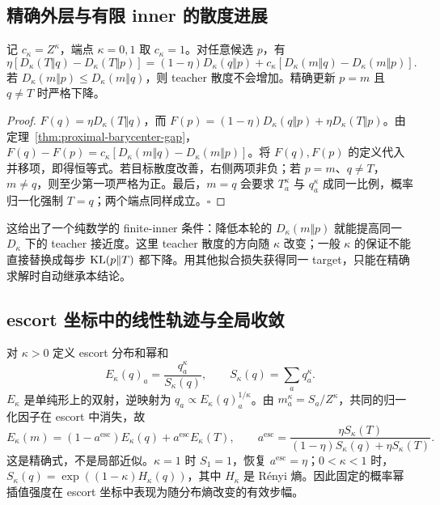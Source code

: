 \subsection{精确外层与有限 inner 的散度进展}

\begin{theorem}
\label{thm:proximal-teacher-progress}
记 $c_\kappa=Z^\kappa$，端点 $\kappa=0,1$ 取 $c_\kappa=1$。对任意候选 $p$，有
\begin{equation}
 \eta\left[D_\kappa(T\Vert q)-D_\kappa(T\Vert p)\right]
 =(1-\eta)D_\kappa(q\Vert p)
 +c_\kappa\left[D_\kappa(m\Vert q)-D_\kappa(m\Vert p)\right].
 \label{eq:proximal-progress-identity}
\end{equation}
若 $D_\kappa(m\Vert p)\le D_\kappa(m\Vert q)$，则 teacher 散度不会增加。精确更新 $p=m$ 且 $q\ne T$ 时严格下降。
\end{theorem}

\begin{proof}
$F(q)=\eta D_\kappa(T\Vert q)$，而 $F(p)=(1-\eta)D_\kappa(q\Vert p)+\eta D_\kappa(T\Vert p)$。由定理~\ref{thm:proximal-barycenter-gap}，$F(q)-F(p)=c_\kappa[D_\kappa(m\Vert q)-D_\kappa(m\Vert p)]$。将 $F(q),F(p)$ 的定义代入并移项，即得恒等式。若目标散度改善，右侧两项非负；若 $p=m$、$q\ne T$，$m\ne q$，则至少第一项严格为正。最后，$m=q$ 会要求 $T_a^\kappa$ 与 $q_a^\kappa$ 成同一比例，概率归一化强制 $T=q$；两个端点同样成立。\hfill$\square$
\end{proof}

这给出了一个纯数学的 finite-inner 条件：降低本轮的 $D_\kappa(m\Vert p)$ 就能提高同一 $D_\kappa$ 下的 teacher 接近度。这里 teacher 散度的方向随 $\kappa$ 改变；一般 $\kappa$ 的保证不能直接替换成每步 $\operatorname{KL}(p\Vert T)$ 都下降。用其他拟合损失获得同一 target，只能在精确求解时自动继承本结论。
\subsection{escort 坐标中的线性轨迹与全局收敛}

对 $\kappa>0$ 定义 escort 分布和幂和
\begin{equation}
 E_\kappa(q)_a=\frac{q_a^\kappa}{S_\kappa(q)},\qquad
 S_\kappa(q)=\sum_aq_a^\kappa.
\end{equation}
$E_\kappa$ 是单纯形上的双射，逆映射为 $q_a\propto E_\kappa(q)_a^{1/\kappa}$。由 $m_a^\kappa=S_a/Z^\kappa$，共同的归一化因子在 escort 中消失，故
\begin{equation}
 E_\kappa(m)=(1-a^{\mathrm{esc}})E_\kappa(q)+a^{\mathrm{esc}}E_\kappa(T),\qquad
 a^{\mathrm{esc}}=\frac{\eta S_\kappa(T)}{(1-\eta)S_\kappa(q)+\eta S_\kappa(T)}.
 \label{eq:proximal-escort-step}
\end{equation}
这是精确式，不是局部近似。$\kappa=1$ 时 $S_1=1$，恢复 $a^{\mathrm{esc}}=\eta$；$0<\kappa<1$ 时，$S_\kappa(q)=\exp((1-\kappa)H_\kappa(q))$，其中 $H_\kappa$ 是 Rényi 熵。因此固定的概率幂插值强度在 escort 坐标中表现为随分布熵改变的有效步幅。

